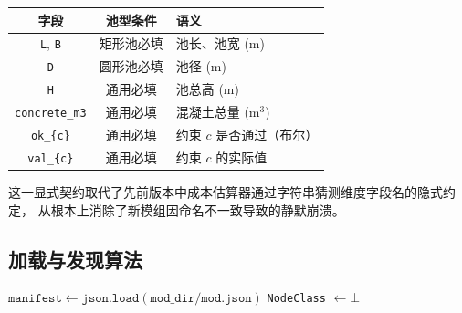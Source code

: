 \documentclass[12pt,a4paper]{ctexart}
\theoremstyle{definition}
\theoremstyle{remark}
\begin{document}
\begin{center}
\begin{tabular}{ccl}
\toprule
\textbf{字段} & \textbf{池型条件} & \textbf{语义} \\
\midrule
\texttt{L}, \texttt{B} & 矩形池必填 & 池长、池宽 (m) \\
\texttt{D}            & 圆形池必填 & 池径 (m) \\
\texttt{H}            & 通用必填   & 池总高 (m) \\
\texttt{concrete\_m3} & 通用必填   & 混凝土总量 (m$^3$) \\
\texttt{ok\_\{c\}}     & 通用必填   & 约束 $c$ 是否通过（布尔） \\
\texttt{val\_\{c\}}    & 通用必填   & 约束 $c$ 的实际值 \\
\bottomrule
\end{tabular}
\end{center}

这一显式契约取代了先前版本中成本估算器通过字符串猜测维度字段名的隐式约定，
从根本上消除了新模组因命名不一致导致的静默崩溃。

\subsection{加载与发现算法}

\begin{algorithm}[htbp]
\caption{模组发现与加载（\texttt{ModManager.load\_mod()}, 行 246--305）}
\label{alg:mod-load}
\BlankLine
$\texttt{manifest} \gets \texttt{json.load}(\texttt{mod\_dir}/\texttt{mod.json})$\;
\texttt{NodeClass} $\gets \bot$\;
\;
\end{algorithm}
\end{document}
